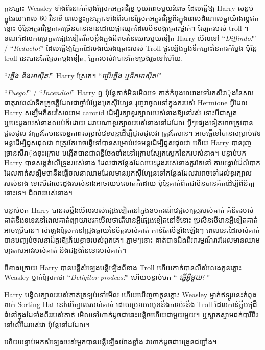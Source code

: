 កូនភ្លោះ Weasley ទាំងពីរនាក់កំពុងស្រែកអក្ខរាវិរុទ្ធ មួយរំពេចមួយរំពេច ដែលធ្វើឱ្យ Harry សន្លប់ក្នុងរយៈពេល 60 វិនាទី ពេលខ្លះកូនភ្លោះទាំងពីរបានស្រែកអក្ខរាវិរុទ្ធពីរក្នុងពេលដំណាលគ្នាយ៉ាងល្អឥតខ្ចោះ ប៉ុន្តែអក្ខរាវិរុទ្ធភាគច្រើនបានរំខានដោយផ្កាឈូកដែលមិនបង្កគ្រោះថ្នាក់។ ស្បែករបស់ troll ។ ខណៈ​ដែល​ការប្រកួត​ផ្សេងទៀត​រឹត​បន្តឹង​ក្នុង​ជីពចរ​នៃ​ឈាម​មួយ​ទៀត Harry មើលទៅ “\emph{Diffindo!}” / “\emph{Reducto!}” ដែល​ធ្វើ​ឱ្យ​ភ្នែក​ដែល​ងាយ​រងគ្រោះ​របស់ Troll ផ្ទុះ​ឡើង​ក្នុង​ទឹក​ភ្លោះ​នៃ​ការ​កំប្លែង ប៉ុន្តែ troll នេះ​បាន​តែ​ស្រែក​ម្តង​ទៀត, ភ្នែក​របស់​វា​បាន​កែ​ទម្រង់​រួច​ទៅ​ហើយ.

“\emph{ភ្លើង និងអាស៊ីត!}” Harry ស្រែក។ “\emph{ប្រើភ្លើង ឬទឹកអាស៊ីត!}”

“\emph{Fuego!}” / “\emph{Incendio!}” Harry ឮ ប៉ុន្តែគាត់មិនមើលទេ គាត់កំពុងឈោងទៅរកសឺរាុំងនៃសារធាតុរាវពណ៌ទឹកក្រូចភ្លឺដែលជាថ្នាំបំប្លែងអុកស៊ីហ្សែន រុញវាចូលទៅក្នុងករបស់ Hermione អ្វីដែល Harry សង្ឃឹមគឺសរសៃឈាម carotid ដើម្បីរក្សាខួរក្បាលរបស់នាងឱ្យនៅរស់ ទោះបីជាសួត ឬបេះដូងរបស់នាងឈប់ក៏ដោយ ដរាបណាខួរក្បាលរបស់នាងនៅដដែល អ្វីៗផ្សេងទៀតអាចត្រូវបានជួសជុល វាត្រូវតែមានលទ្ធភាពសម្រាប់វេទមន្តដើម្បីជួសជុលវា ត្រូវតែមាន។ អាចធ្វើទៅបានសម្រាប់វេទមន្តដើម្បីជួសជុលវា វាត្រូវតែអាចធ្វើទៅបានសម្រាប់វេទមន្តដើម្បីជួសជុលវា ហើយ Harry បានរុញច្រានសឺរាុំងចុះក្រោម បង្កើតបានជាពន្លឺចែងចាំងនៅក្រោមស្បែកស្លេកនៃករបស់នាង។ បន្ទាប់មក Harry បានសង្កត់លើទ្រូងរបស់នាង ដែលជាកន្លែងដែលបេះដូងរបស់នាងគួរតែនៅ ការបង្ហាប់ដ៏លំបាកដែលគាត់សង្ឃឹមថានឹងធ្វើចលនាឈាមដែលមានអុកស៊ីហ្សែនទៅកន្លែងដែលវាអាចទៅដល់ខួរក្បាលរបស់នាង ទោះបីជាបេះដូងរបស់នាងអាចឈប់លោតក៏ដោយ ប៉ុន្តែគាត់ពិតជាមិនបានគិតដើម្បីពិនិត្យនោះទេ។ ជីពចររបស់នាង។

បន្ទាប់មក Harry បានសម្លឹងមើលរបស់ផ្សេងទៀតនៅក្នុងឧបករណ៍វេជ្ជសាស្ត្ររបស់គាត់ គំនិតរបស់គាត់នឹងទទេរនៅពេលគាត់ព្យាយាមរកមើលថាតើមានអ្វីផ្សេងទៀតនៅទីនោះ ប្រសិនបើមានអ្វីទៀតគាត់អាចប្រើបាន។ សំឡេងស្រែកនៅជ្រុងឆ្ងាយនៃចិត្តរបស់គាត់ កាន់តែលឺខ្លាំងឡើងៗ ពេលនេះដៃរបស់គាត់បានបញ្ឈប់ចលនាដ៏គួរឱ្យភ័យខ្លាចរបស់ពួកគេ។ ភ្លាមៗ​នោះ គាត់​បាន​ដឹង​ពី​អារម្មណ៍​រាវ​ដែល​មាន​ឈាម​ហូរ​តាម​អាវ​របស់​គាត់ និង​ជង្គង់​នៃ​ខោ​របស់គាត់។

ពីខាងក្រោយ Harry បានបន្លឺសំឡេងបន្លឺឡើងពីខាង Troll ហើយគាត់បានលឺសំលេងកូនភ្លោះ Weasley ម្នាក់ស្រែកថា “\emph{Deligitor prodeas!}” ហើយបន្ទាប់មក “\emph{ ធ្វើអ្វីមួយ! }”

Harry បង្វិលក្បាលរបស់គាត់ត្រឡប់ទៅមើល ហើយឃើញថាកូនភ្លោះ Weasley ម្នាក់ឥឡូវនេះកំពុងពាក់ Sorting Hat នៅលើក្បាលរបស់គាត់ ដោយប្រឈមមុខនឹងការប៉ះនឹង Troll ដែលកាន់ក្លឹបថ្មដ៏ធំនៅក្នុងដៃទាំងពីររបស់គាត់ មើលទៅហាក់ដូចជាឆេះបន្តិចហើយជាមួយមួយ។ ឬស្លាកស្នាមជក់បារីពីរនៅលើដៃរបស់វា ប៉ុន្តែនៅដដែល។

ហើយបន្ទាប់មកសំឡេងរបស់មួកបានបន្លឺឡើងយ៉ាងខ្លាំង វាហាក់ដូចជាអង្រួនជញ្ជាំង។

